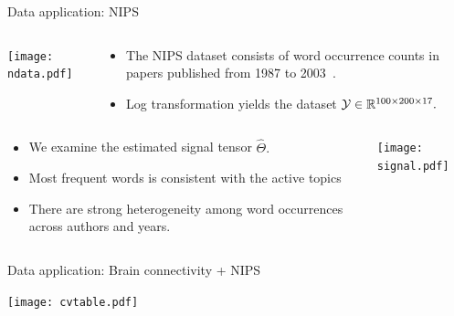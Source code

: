 \documentclass[10pt, mathserif]{beamer} %
\theoremstyle{definition}
\theoremstyle{plain}
\begin{document}
\begin{frame}{Data application: NIPS}
    \begin{columns}
\begin{column}{0.21\textwidth}
   \begin{center}
     \texttt{[image: ndata.pdf]}
     \end{center}
\end{column}
\begin{column}{0.7\textwidth} 
\begin{itemize}
    \item The NIPS dataset consists of word occurrence counts in papers published from 1987 to 2003~\citep{globerson2007euclidean}.
    \item Log transformation yields the dataset $\mathcal{Y}\in\mathbb{R}^{100\times200\times17}.$ 
\end{itemize}
\end{column}
\end{columns}

\begin{columns}
\begin{column}{0.6\textwidth}
 \begin{itemize}
     \item We examine the estimated signal tensor $\hat\Theta.$
     \item Most frequent words is consistent with the active topics
     \item There are strong heterogeneity among word occurrences across authors and years.
 \end{itemize}
\end{column}
\begin{column}{0.4\textwidth} 
   \begin{center}
     \texttt{[image: signal.pdf]}
     \end{center}
\end{column}
\end{columns}
\end{frame}

\begin{frame}{Data application: Brain connectivity + NIPS}
      \begin{center}
     \begin{table}
    \texttt{[image: cvtable.pdf]}
    \caption{MAE comparison in the brain data and NIPS data on cross-validation (5 repetitions 5 folds).  Standard errors are reported in parenthesis.}
    \end{table}
    \end{center}
\end{frame}
\end{document}
